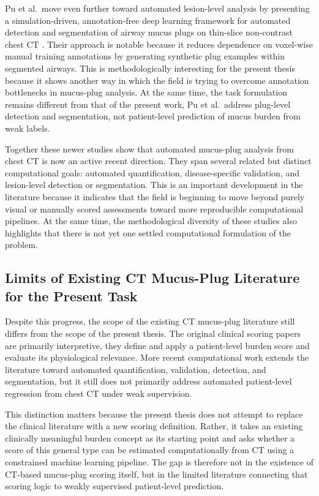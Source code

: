 Pu et al.\ move even further toward automated lesion-level analysis by presenting a simulation-driven, annotation-free deep learning framework for automated detection and segmentation of airway mucus plugs on thin-slice non-contrast chest CT \cite{pu2026simulation}. Their approach is notable because it reduces dependence on voxel-wise manual training annotations by generating synthetic plug examples within segmented airways. This is methodologically interesting for the present thesis because it shows another way in which the field is trying to overcome annotation bottlenecks in mucus-plug analysis. At the same time, the task formulation remains different from that of the present work, Pu et al.\ address plug-level detection and segmentation, not patient-level prediction of mucus burden from weak labels.

Together these newer studies show that automated mucus-plug analysis from chest CT is now an active recent direction. They span several related but distinct computational goals: automated quantification, disease-specific validation, and lesion-level detection or segmentation. This is an important development in the literature because it indicates that the field is beginning to move beyond purely visual or manually scored assessments toward more reproducible computational pipelines. At the same time, the methodological diversity of these studies also highlights that there is not yet one settled computational formulation of the problem.


\subsection{Limits of Existing CT Mucus-Plug Literature for the Present Task}
Despite this progress, the scope of the existing CT mucus-plug literature still differs from the scope of the present thesis. The original clinical scoring papers are primarily interpretive, they define and apply a patient-level burden score and evaluate its physiological relevance. More recent computational work extends the literature toward automated quantification, validation, detection, and segmentation, but it still does not primarily address automated patient-level regression from chest CT under weak supervision.

This distinction matters because the present thesis does not attempt to replace the clinical literature with a new scoring definition. Rather, it takes an existing clinically meaningful burden concept as its starting point and asks whether a score of this general type can be estimated computationally from CT using a constrained machine learning pipeline. The gap is therefore not in the existence of CT-based mucus-plug scoring itself, but in the limited literature connecting that scoring logic to weakly supervised patient-level prediction.

